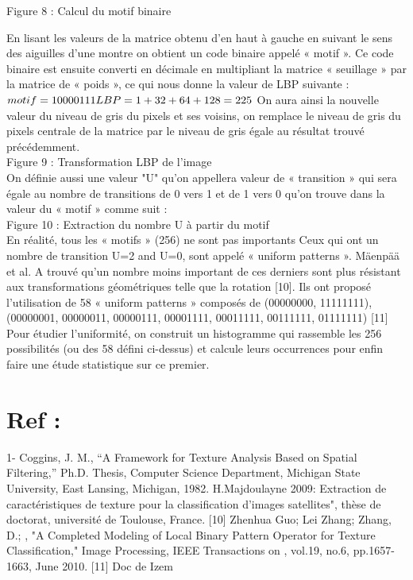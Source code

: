 \documentclass[12pt]{article}
\begin{document}
Figure 8 : Calcul du motif binaire

En lisant les valeurs de la matrice obtenu d’en haut à gauche en suivant le sens des  aiguilles d’une montre on obtient un code binaire appelé « motif ». Ce code binaire est ensuite converti en décimale en multipliant la matrice « seuillage » par la matrice de « poids », ce qui nous donne la valeur de LBP suivante :
$
motif = 10000111 \\
LBP = 1 +32 + 64 + 128 = 225 \\
$
On aura ainsi la nouvelle valeur du niveau de gris du pixels et ses voisins, on remplace le niveau de gris du pixels centrale de la matrice par le niveau de gris égale au résultat trouvé précédemment.\\



Figure 9 : Transformation LBP de l'image\\


On définie aussi une valeur "U" qu'on appellera valeur de « transition » qui sera égale au nombre de transitions de 0 vers 1 et de 1 vers 0 qu'on trouve dans la valeur du « motif » comme suit :\\



Figure 10 : Extraction du nombre U à partir du motif\\


En réalité, tous les « motifs » (256) ne sont pas importants
Ceux qui ont un nombre de transition U=2 and U=0, sont appelé « uniform patterns ». Mäenpää et al. A trouvé qu’un nombre moins important de ces derniers sont plus résistant aux transformations géométriques telle que la rotation [10]. Ils ont proposé l’utilisation de 58 « uniform patterns » composés de (00000000, 11111111), (00000001, 00000011, 00000111, 00001111, 00011111, 00111111, 01111111) [11]
Pour étudier l’uniformité, on construit un histogramme qui rassemble les 256 possibilités (ou des 58 défini ci-dessus) et calcule leurs occurrences pour enfin faire une étude statistique sur ce premier.\\



\section*{Ref :}
1- Coggins, J. M., “A Framework for Texture Analysis Based on Spatial Filtering,” Ph.D. Thesis, Computer Science Department, Michigan State University, East Lansing, Michigan, 1982.
H.Majdoulayne 2009:  Extraction de caractéristiques de texture pour la classification d'images satellites", thèse de doctorat, université de Toulouse, France. 
[10] Zhenhua Guo; Lei Zhang; Zhang, D.; , "A Completed Modeling of Local Binary Pattern Operator for Texture Classification," Image Processing, IEEE Transactions on , vol.19, no.6, pp.1657-1663, June 2010.
[11] Doc de Izem
\end{document}
